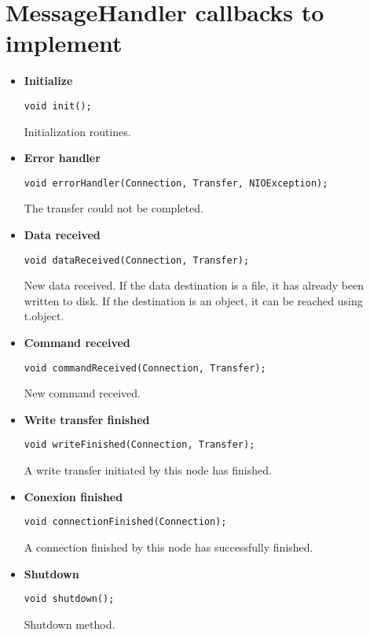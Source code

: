 \documentclass[10pt]{article}
\begin{document}
\section{MessageHandler callbacks to implement}
\begin{itemize}
	\item \textbf{Initialize}
	\begin{lstlisting}
void init();
	\end{lstlisting}
	Initialization routines.
	
	\item \textbf{Error handler}
	\begin{lstlisting}
void errorHandler(Connection, Transfer, NIOException);
	\end{lstlisting}
	The transfer could not be completed.
	
	\item \textbf{Data received}
	\begin{lstlisting}
void dataReceived(Connection, Transfer);
	\end{lstlisting}
	New data received. If the data destination is a file, it has already been written to disk. If the destination is an object, it can be reached using t.object.
	
	\item \textbf{Command received}
	\begin{lstlisting}
void commandReceived(Connection, Transfer);
	\end{lstlisting}
	New command received.
	
	\item \textbf{Write transfer finished}
	\begin{lstlisting}
void writeFinished(Connection, Transfer);
	\end{lstlisting}
	A write transfer initiated by this node has finished.
	
	\item \textbf{Conexion finished}
	\begin{lstlisting}
void connectionFinished(Connection);
	\end{lstlisting}
	A connection finished by this node has successfully finished.
	
	\item \textbf{Shutdown}
	\begin{lstlisting}
void shutdown();
	\end{lstlisting}
	Shutdown method.
	
\end{itemize}
\end{document}
